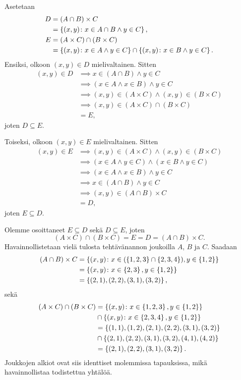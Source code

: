 \documentclass[11pt,a4paper]{amsart}
\begin{document}
\begin{solution}
Asetetaan
\[
\begin{aligned}
D &= (A \cap B) \times C \\
&= \left\lbrace(x, y) \colon x \in A \cap B \land y \in C\right\rbrace, \\
E &= (A \times C) \cap (B \times C) \\
&= \left\lbrace(x, y) \colon x \in A \land y \in C\right\rbrace \cap \left\lbrace(x, y) \colon x \in
B \land y \in C\right\rbrace.
\end{aligned}
\]
Ensiksi, olkoon \((x, y) \in D\) mielivaltainen. Sitten
\[
\begin{aligned}
(x, y) \in D &\implies x \in (A \cap B) \land y \in C \\
&\implies (x \in A \land x \in B) \land y \in C \\
&\implies (x, y) \in (A \times C) \land (x, y) \in (B \times C) \\
&\implies (x, y) \in (A \times C) \cap (B \times C) \\
&= E,
\end{aligned}
\]
joten \(D \subseteq E\).

Toiseksi, olkoon \((x, y) \in E\) mielivaltainen. Sitten
\[
\begin{aligned}
(x, y) \in E &\implies (x, y) \in (A \times C) \land (x, y) \in (B \times C) \\
&\implies (x \in A \land y \in C) \land (x \in B \land y \in C) \\
&\implies (x \in A \land x \in B) \land y \in C \\
&\implies x \in (A \cap B) \land y \in C \\
&\implies (x, y) \in (A \cap B) \times C \\
&= D,
\end{aligned}
\]
joten \(E \subseteq D\).

Olemme osoittaneet \(E \subseteq D\) sekä \(D \subseteq E\), joten
\[
(A \times C) \cap (B \times C) = E = D = (A \cap B) \times C.
\]
Havainnollistetaan vielä tulosta tehtävänannon joukoilla \(A\), \(B\) ja \(C\).
Saadaan
\[
\begin{aligned}
(A \cap B) \times C &= \left\lbrace(x, y) \colon x \in (\left\lbrace1,2,3\right\rbrace \cap
\left\lbrace2,3,4\right\rbrace), y \in \left\lbrace1, 2\right\rbrace\right\rbrace \\
&= \left\lbrace(x, y) \colon x \in \left\lbrace2,3\right\rbrace, y \in \left\lbrace1, 2\right\rbrace\right\rbrace \\
&= \left\lbrace(2, 1), (2, 2), (3, 1), (3, 2)\right\rbrace,
\end{aligned}
\]
sekä
\[
\begin{aligned}
(A \times C) \cap (B \times C) &= \left\lbrace(x, y) \colon x \in
\left\lbrace1,2,3\right\rbrace, y \in \left\lbrace1,2\right\rbrace\right\rbrace \\
&\cap \left\lbrace(x, y) \colon x \in \left\lbrace2,3,4\right\rbrace, y \in \left\lbrace1,2\right\rbrace\right\rbrace \\
&= \left\lbrace(1,1),(1,2),(2,1),(2,2),(3,1),(3,2)\right\rbrace \\ &\cap \left\lbrace(2, 1), (2,
2), (3, 1), (3, 2), (4, 1), (4, 2)\right\rbrace \\
&= \left\lbrace(2,1),(2,2),(3,1),(3,2)\right\rbrace.
\end{aligned}
\]
Joukkojen alkiot ovat siis identtiset molemmissa tapauksissa, mikä
havainnollistaa todistettua yhtälöä.
\end{solution}
\end{document}
